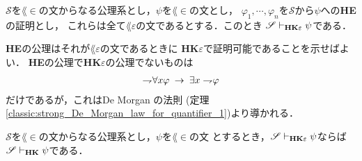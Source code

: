 	\begin{screen}
		\begin{metathm}
		\label{metathm:Henkin_expansion_1}
			$\mathscr{S}$を$\lang{\in}$の文からなる公理系とし，$\psi$を$\lang{\in}$の文とし，
			$\varphi_{1},\cdots,\varphi_{n}$を$\mathscr{S}$から$\psi$への{\bf HE}の証明とし，
			これらは全て$\lang{\varepsilon}$の文であるとする．このとき
			$\mathscr{S} \vdash_{{\scriptsize \mbox{{\bf HK$\varepsilon$}}}} \psi$である．
		\end{metathm}
	\end{screen}
	
	\begin{metaprf}
		{\bf HE}の公理はそれが$\lang{\varepsilon}$の文であるときに
		{\bf HK$\varepsilon$}で証明可能であることを示せばよい．
		{\bf HE}の公理で{\bf HK$\varepsilon$}の公理でないものは
		\begin{align}
			\rightharpoondown\hspace{-0.25em} \forall x \varphi \hspace{0.25em}\rightarrow\hspace{0.25em} \exists x \rightharpoondown\hspace{-0.25em} \varphi
		\end{align}
		だけであるが，これはDe Morgan の法則
		(定理\ref{classic:strong_De_Morgan_law_for_quantifier_1})より導かれる．
		\QED
	\end{metaprf}
	
	\begin{screen}
		\begin{metathm}
		\label{metathm:Henkin_expansion_2}
			$\mathscr{S}$を$\lang{\in}$の文からなる公理系とし，$\psi$を$\lang{\in}$の文
			とするとき，$\mathscr{S} \vdash_{{\scriptsize \mbox{{\bf HK$\varepsilon$}}}} \psi$ならば
			$\mathscr{S} \vdash_{{\scriptsize \mbox{{\bf HK}}}} \psi$である．
		\end{metathm}
	\end{screen}
	
